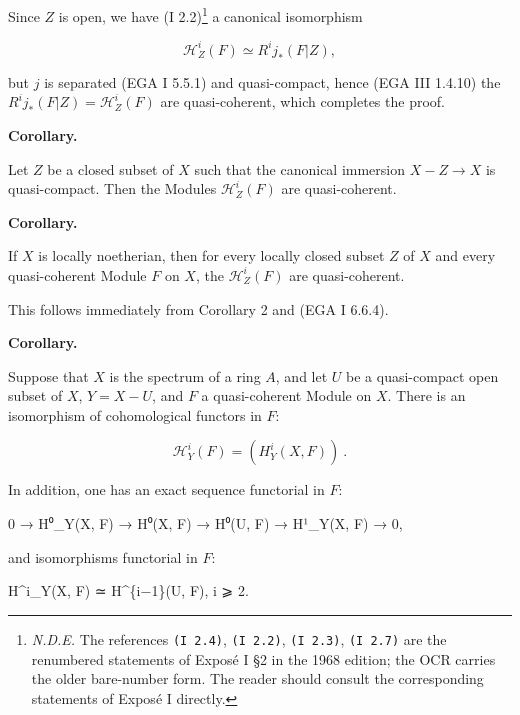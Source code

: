 \documentclass[
]{article}
\newenvironment{Shaded}{}{}
\newcommand{\NormalTok}[1]{#1}
\begin{document}
Since \(Z\) is open, we have (I 2.2)\footnote{\emph{N.D.E.} The
  references \texttt{(I\ 2.4)}, \texttt{(I\ 2.2)}, \texttt{(I\ 2.3)},
  \texttt{(I\ 2.7)} are the renumbered statements of Exposé I §2 in the
  1968 edition; the OCR carries the older bare-number form. The reader
  should consult the corresponding statements of Exposé I directly.} a
canonical isomorphism

\[
\mathcal{H}^{i}_{Z}(F) \simeq R^{i} j_{*}(F|Z),
\]

but \(j\) is separated (EGA I 5.5.1) and quasi-compact, hence (EGA III
1.4.10) the \(R^{i} j_{*}(F|Z) = \mathcal{H}^{i}_{Z}(F)\) are
quasi-coherent, which completes the proof.

\textbf{Corollary.}

Let \(Z\) be a closed subset of \(X\) such that the canonical immersion
\(X - Z \to X\) is quasi-compact. Then the Modules
\(\mathcal{H}^{i}_{Z}(F)\) are quasi-coherent.

\textbf{Corollary.}

If \(X\) is locally noetherian, then for every locally closed subset
\(Z\) of \(X\) and every quasi-coherent Module \(F\) on \(X\), the
\(\mathcal{H}^{i}_{Z}(F)\) are quasi-coherent.

This follows immediately from Corollary 2 and (EGA I 6.6.4).

\textbf{Corollary.}

Suppose that \(X\) is the spectrum of a ring \(A\), and let \(U\) be a
quasi-compact open subset of \(X\), \(Y = X - U\), and \(F\) a
quasi-coherent Module on \(X\). There is an isomorphism of cohomological
functors in \(F\):

\[
\mathcal{H}^{i}_{Y}(F) = (H^{i}_{Y}(X, F))~.
\]

In addition, one has an exact sequence functorial in \(F\):

\begin{Shaded}
\begin{Highlighting}[]
\NormalTok{0 → H⁰\_Y(X, F) → H⁰(X, F) → H⁰(U, F) → H¹\_Y(X, F) → 0,}
\end{Highlighting}
\end{Shaded}

and isomorphisms functorial in \(F\):

\begin{Shaded}
\begin{Highlighting}[]
\NormalTok{H\^{}i\_Y(X, F) ≃ H\^{}\{i−1\}(U, F),    i ⩾ 2.}
\end{Highlighting}
\end{Shaded}
\end{document}

